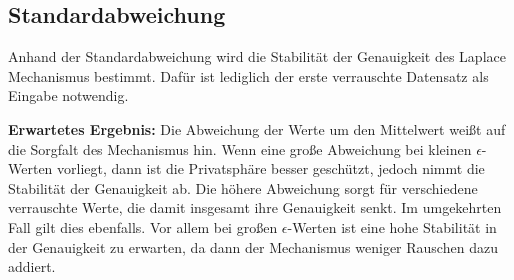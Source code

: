 \subsection{Standardabweichung}
Anhand der Standardabweichung wird die Stabilität der Genauigkeit des Laplace Mechanismus bestimmt. Dafür ist lediglich der erste verrauschte Datensatz als Eingabe notwendig.

\textbf{Erwartetes Ergebnis:}
Die Abweichung der Werte um den Mittelwert weißt auf die Sorgfalt des Mechanismus hin. Wenn eine große Abweichung bei kleinen $\epsilon$-Werten vorliegt, dann ist die Privatsphäre besser geschützt, jedoch nimmt die Stabilität der Genauigkeit ab. Die höhere Abweichung sorgt für verschiedene verrauschte Werte, die damit insgesamt ihre Genauigkeit senkt. Im umgekehrten Fall gilt dies ebenfalls. Vor allem bei großen $\epsilon$-Werten ist eine hohe Stabilität in der Genauigkeit zu erwarten, da dann der Mechanismus weniger Rauschen dazu addiert.

